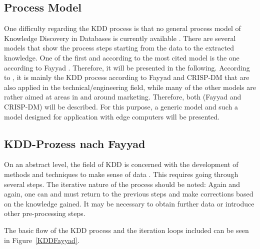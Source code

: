 \subsection{Process Model}

One difficulty regarding the KDD process is that \glqq no general process model of Knowledge Discovery in Databases is currently available \grqq \cite{Dusing.2000}. There are several models that show the process steps starting from the data to the extracted knowledge.  One of the first and according to \cite{Kurgan:2006} the most cited model is the one according to Fayyad \cite{Fayyad:1996}. Therefore, it will be presented in the following. According to \cite{Kurgan:2006}, it is mainly the KDD process according to Fayyad and CRISP-DM that are also applied in the technical/engineering field, while many of the other models are rather aimed at areas in and around marketing. Therefore, both (Fayyad and CRISP-DM) will be described.  For this purpose, a generic model and such a model designed for application with edge computers will be presented.


\subsection{KDD-Prozess nach Fayyad}
On an abstract level, the field of KDD is concerned with the development of methods and techniques to \glqq make sense of data \grqq \cite{Fayyad:1996}. This requires going through several steps. The iterative nature of the process should be noted: Again and again, one can and must return to the previous steps and make corrections based on the knowledge gained. It may be necessary to obtain further data or introduce other pre-processing steps. \cite{Wrobel:1998}

The basic flow of the KDD process and the iteration loops included can be seen in Figure~\ref{KDDFayyad}.

